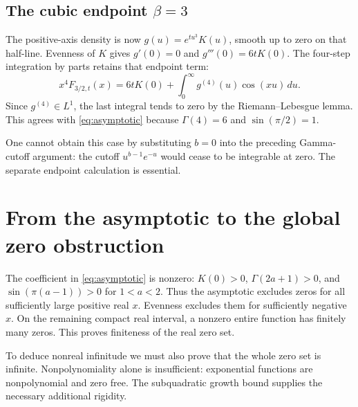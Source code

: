 \documentclass[11pt]{article}
\theoremstyle{remark}\newtheorem{remark}[theorem]{Remark}
\begin{document}
\subsection{The cubic endpoint $\beta=3$}
The positive-axis density is now $g(u)=e^{tu^3}K(u)$,
smooth up to zero on that half-line. Evenness of $K$ gives
$g'(0)=0$ and $g'''(0)=6tK(0)$. The four-step integration by parts
retains that endpoint term:
\begin{equation}\label{eq:cubic}
 x^4F_{3/2,t}(x)=6tK(0)+\int_0^\infty g^{(4)}(u)\cos(xu)\,du.
\end{equation}
Since $g^{(4)}\in L^1$, the last integral tends to zero by the
Riemann--Lebesgue lemma. This agrees with \eqref{eq:asymptotic}
because $\Gamma(4)=6$ and $\sin(\pi/2)=1$.

One cannot obtain this case by substituting $b=0$ into the preceding
Gamma-cutoff argument: the cutoff $u^{b-1}e^{-u}$ would cease to be
integrable at zero. The separate endpoint calculation is essential.

\section{From the asymptotic to the global zero obstruction}
The coefficient in \eqref{eq:asymptotic} is nonzero: $K(0)>0$,
$\Gamma(2a+1)>0$, and $\sin(\pi(a-1))>0$ for $1<a<2$.
Thus the asymptotic excludes zeros for all sufficiently large positive
real $x$. Evenness excludes them for sufficiently negative $x$.
On the remaining compact real interval, a nonzero entire function
has finitely many zeros. This proves finiteness of the real zero set.

To deduce nonreal infinitude we must also prove that the whole zero
set is infinite. Nonpolynomiality alone is insufficient: exponential
functions are nonpolynomial and zero free. The subquadratic growth
bound supplies the necessary additional rigidity.
\end{document}
